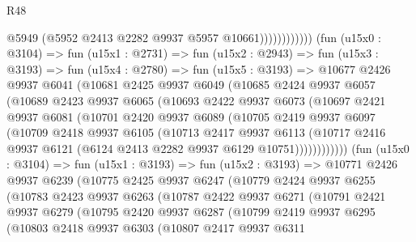 \begin{lexlean}{R48}
\begin{coremodule}
                              @5949
                              (@5952 @2413 @2282 @9937 @5957 @10661))))))))))))
        (fun (u15x0 : @3104) =>
        fun (u15x1 : @2731) =>
        fun (u15x2 : @2943) =>
        fun (u15x3 : @3193) =>
        fun (u15x4 : @2780) =>
        fun (u15x5 : @3193) =>
        @10677
          @2426
          @9937
          @6041
          (@10681
            @2425
            @9937
            @6049
            (@10685
              @2424
              @9937
              @6057
              (@10689
                @2423
                @9937
                @6065
                (@10693
                  @2422
                  @9937
                  @6073
                  (@10697
                    @2421
                    @9937
                    @6081
                    (@10701
                      @2420
                      @9937
                      @6089
                      (@10705
                        @2419
                        @9937
                        @6097
                        (@10709
                          @2418
                          @9937
                          @6105
                          (@10713
                            @2417
                            @9937
                            @6113
                            (@10717
                              @2416
                              @9937
                              @6121
                              (@6124 @2413 @2282 @9937 @6129 @10751))))))))))))
        (fun (u15x0 : @3104) =>
        fun (u15x1 : @3193) =>
        fun (u15x2 : @3193) =>
        @10771
          @2426
          @9937
          @6239
          (@10775
            @2425
            @9937
            @6247
            (@10779
              @2424
              @9937
              @6255
              (@10783
                @2423
                @9937
                @6263
                (@10787
                  @2422
                  @9937
                  @6271
                  (@10791
                    @2421
                    @9937
                    @6279
                    (@10795
                      @2420
                      @9937
                      @6287
                      (@10799
                        @2419
                        @9937
                        @6295
                        (@10803
                          @2418
                          @9937
                          @6303
                          (@10807
                            @2417
                            @9937
                            @6311

\end{coremodule}
\end{lexlean}
